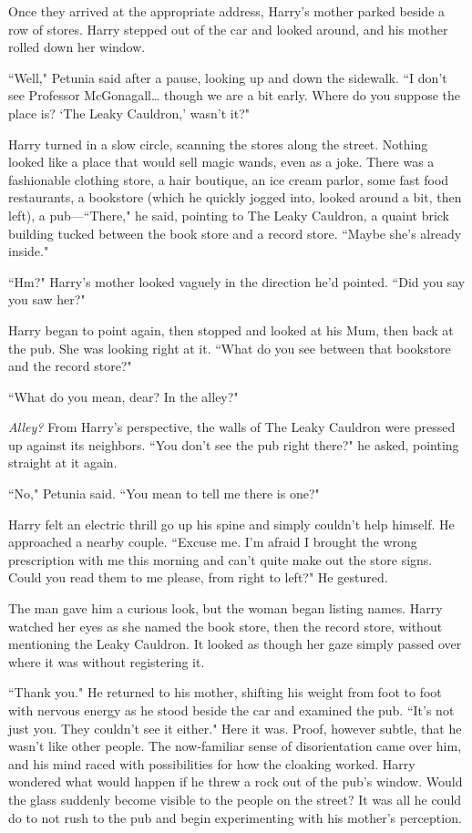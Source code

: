 Once they arrived at the appropriate address, Harry's mother parked beside a row of stores. Harry stepped out of the car and looked around, and his mother rolled down her window.

``Well," Petunia said after a pause, looking up and down the sidewalk. ``I don't see Professor McGonagall{\ldots} though we are a bit early. Where do you suppose the place is? `The Leaky Cauldron,' wasn't it?"

Harry turned in a slow circle, scanning the stores along the street. Nothing looked like a place that would sell magic wands, even as a joke. There was a fashionable clothing store, a hair boutique, an ice cream parlor, some fast food restaurants, a bookstore (which he quickly jogged into, looked around a bit, then left), a pub---``There," he said, pointing to The Leaky Cauldron, a quaint brick building tucked between the book store and a record store. ``Maybe she's already inside."

``Hm?" Harry's mother looked vaguely in the direction he'd pointed. ``Did you say you saw her?"

Harry began to point again, then stopped and looked at his Mum, then back at the pub. She was looking right at it. ``What do you see between that bookstore and the record store?"

``What do you mean, dear? In the alley?"

\emph{Alley?} From Harry's perspective, the walls of The Leaky Cauldron were pressed up against its neighbors. ``You don't see the pub right there?" he asked, pointing straight at it again.

``No," Petunia said. ``You mean to tell me there is one?"

Harry felt an electric thrill go up his spine and simply couldn't help himself. He approached a nearby couple. ``Excuse me. I'm afraid I brought the wrong prescription with me this morning and can't quite make out the store signs. Could you read them to me please, from right to left?" He gestured.

The man gave him a curious look, but the woman began listing names. Harry watched her eyes as she named the book store, then the record store, without mentioning the Leaky Cauldron. It looked as though her gaze simply passed over where it was without registering it.

``Thank you." He returned to his mother, shifting his weight from foot to foot with nervous energy as he stood beside the car and examined the pub. ``It's not just you. They couldn't see it either." Here it was. Proof, however subtle, that he wasn't like other people. The now-familiar sense of disorientation came over him, and his mind raced with possibilities for how the cloaking worked. Harry wondered what would happen if he threw a rock out of the pub's window. Would the glass suddenly become visible to the people on the street? It was all he could do to not rush to the pub and begin experimenting with his mother's perception.

